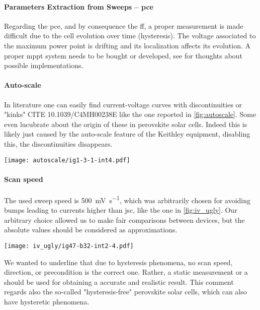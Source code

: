 	\paragraph{Parameters Extraction from Sweeps -- \gls{pce}} Regarding the \gls{pce}, and by consequence the \gls{ff}, a proper measurement is made difficult due to the cell evolution over time (hysteresis). The voltage associated to the maximum power point is drifting and its localization affects its evolution. A proper \gls{mppt} system needs to be bought or developed, see  for thoughts about possible implementations.

	\paragraph{Auto-scale}\label{autoscale} In literature one can easily find current-voltage curves with discontinuities or "kinks"\cite{Li2016,Snaith2014,Zhang2015} CITE  10.1039/C4MH00238E  like the one reported in \cref{fig:autoscale}. Some even lucubrate about the origin of these in perovskite solar cells. Indeed this is likely just caused by the auto-scale feature of the Keithley equipment, disabling this, the discontinuities disappears.

	\begin{SCfigure}%
		\centering
		\texttt{[image: autoscale/ig1-3-1-int4.pdf]}
		\label{fig:autoscale}
	\end{SCfigure}

	\paragraph{Scan speed} The used sweep speed is \SI{500}{\mV\per\s}, which was arbitrarily chosen for avoiding bumps leading to currents higher than \gls{jsc}, like the one in \cref{fig:iv_ugly}. %
	Our arbitrary choice allowed us to make fair comparisons between devices, but the absolute values should be considered as approximations.
	\begin{SCfigure}%
		\centering
		\texttt{[image: iv\_ugly/ig47-b32-int2-4.pdf]}
		\label{fig:iv_ugly}
	\end{SCfigure}
	We wanted to underline that due to hysteresis phenomena, no scan speed, direction, or precondition is the correct one.  %
	Rather, a static measurement or a  should be used for obtaining a accurate and realistic result.
	This comment regards also the so-called "hysteresis-free" perovskite solar cells, which can also have hysteretic phenomena\cite{Jacobs2018}.

